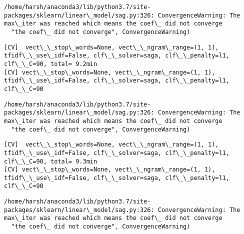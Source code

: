 \documentclass[11pt]{article}
\begin{document}
    \begin{Verbatim}[commandchars=\\\{\}]
/home/harsh/anaconda3/lib/python3.7/site-packages/sklearn/linear\_model/sag.py:326: ConvergenceWarning: The max\_iter was reached which means the coef\_ did not converge
  "the coef\_ did not converge", ConvergenceWarning)

    \end{Verbatim}

    \begin{Verbatim}[commandchars=\\\{\}]
[CV]  vect\_\_stop\_words=None, vect\_\_ngram\_range=(1, 1), tfidf\_\_use\_idf=False, clf\_\_solver=saga, clf\_\_penalty=l1, clf\_\_C=90, total= 9.2min
[CV] vect\_\_stop\_words=None, vect\_\_ngram\_range=(1, 1), tfidf\_\_use\_idf=False, clf\_\_solver=saga, clf\_\_penalty=l1, clf\_\_C=90 

    \end{Verbatim}

    \begin{Verbatim}[commandchars=\\\{\}]
/home/harsh/anaconda3/lib/python3.7/site-packages/sklearn/linear\_model/sag.py:326: ConvergenceWarning: The max\_iter was reached which means the coef\_ did not converge
  "the coef\_ did not converge", ConvergenceWarning)

    \end{Verbatim}

    \begin{Verbatim}[commandchars=\\\{\}]
[CV]  vect\_\_stop\_words=None, vect\_\_ngram\_range=(1, 1), tfidf\_\_use\_idf=False, clf\_\_solver=saga, clf\_\_penalty=l1, clf\_\_C=90, total= 9.3min
[CV] vect\_\_stop\_words=None, vect\_\_ngram\_range=(1, 1), tfidf\_\_use\_idf=False, clf\_\_solver=saga, clf\_\_penalty=l1, clf\_\_C=90 

    \end{Verbatim}

    \begin{Verbatim}[commandchars=\\\{\}]
/home/harsh/anaconda3/lib/python3.7/site-packages/sklearn/linear\_model/sag.py:326: ConvergenceWarning: The max\_iter was reached which means the coef\_ did not converge
  "the coef\_ did not converge", ConvergenceWarning)

    \end{Verbatim}
\end{document}
